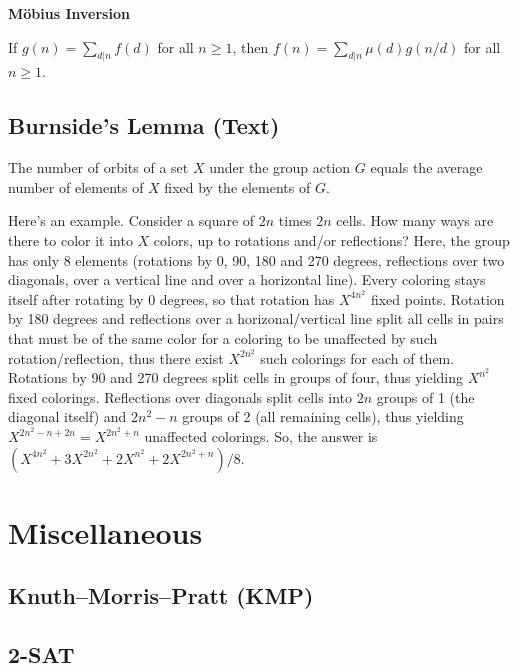 \documentclass[9pt]{extarticle}
\begin{document}
\begin{multicols}{3}
\textbf{M\"obius Inversion}

If $g(n) = \sum_{d|n} f(d)$ for all $n \ge 1$, then $f(n) = \sum_{d|n} \mu(d)g(n/d)$ for all $n \ge 1$.

\subsection{Burnside's Lemma (Text)}
The number of orbits of a set $X$ under the group action $G$ equals the average number of elements of $X$ fixed by the elements of $G$.

Here's an example. Consider a square of $2n$ times $2n$ cells. How many ways are there to color it into $X$ colors, up to rotations and/or reflections?
Here, the group has only 8 elements (rotations by 0, 90, 180 and 270 degrees, reflections over two 
diagonals, over a vertical line and over a horizontal line). Every coloring stays itself after 
rotating by 0 degrees, so that rotation has $X^{4n^2}$ fixed points. Rotation by 180 degrees and 
reflections over a horizonal/vertical line split all cells in pairs that must be of the same color 
for a coloring to be unaffected by such rotation/reflection, thus there exist $X^{2n^2}$ such 
colorings for each of them. Rotations by 90 and 270 degrees split cells in groups of four, thus 
yielding $X^{n^2}$ fixed colorings. Reflections over diagonals split cells into $2n$ groups of 1 
(the diagonal itself) and $2n^2-n$ groups of 2 (all remaining cells), thus yielding 
$X^{2n^2-n+2n}=X^{2n^2+n}$ unaffected colorings. 
So, the answer is $(X^{4n^2}+3X^{2n^2}+2X^{n^2}+2X^{2n^2+n})/8$.

\section{Miscellaneous}

\subsection{Knuth--Morris--Pratt (KMP)}


\subsection{2-SAT}



\end{multicols}
\end{document}
